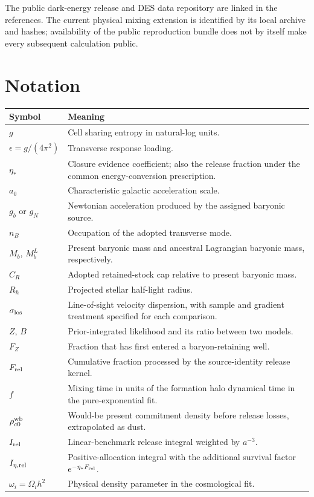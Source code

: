 The public dark-energy release and DES data repository are linked in the
references. The current physical mixing extension is identified by its
local archive and hashes; availability of the public reproduction bundle
does not by itself make every subsequent calculation public.

\section{Notation}
\small
\begin{tabularx}{\textwidth}{P{.23\textwidth}Y}
\toprule Symbol & Meaning \\
\midrule
$g$ & Cell sharing entropy in natural-log units. \\
$\epsilon=g/(4\pi^2)$ & Transverse response loading. \\
$\eta_*$ & Closure evidence coefficient; also the release fraction under
the common energy-conversion prescription. \\
$a_0$ & Characteristic galactic acceleration scale. \\
$g_b$ or $g_N$ & Newtonian acceleration produced by the assigned baryonic
source. \\
$n_B$ & Occupation of the adopted transverse mode. \\
$M_b$, $M_b^L$ & Present baryonic mass and ancestral Lagrangian baryonic
mass, respectively. \\
$C_R$ & Adopted retained-stock cap relative to present baryonic mass. \\
$R_h$ & Projected stellar half-light radius. \\
$\sigma_{\rm los}$ & Line-of-sight velocity dispersion, with sample and
gradient treatment specified for each comparison. \\
$Z$, $B$ & Prior-integrated likelihood and its ratio between two models. \\
$F_Z$ & Fraction that has first entered a baryon-retaining well. \\
$F_{\rm rel}$ & Cumulative fraction processed by the source-identity
release kernel. \\
$f$ & Mixing time in units of the formation halo dynamical time in the
pure-exponential fit. \\
$\rho_{c0}^{\rm wb}$ & Would-be present commitment density before release
losses, extrapolated as dust. \\
$I_{\rm rel}$ & Linear-benchmark release integral weighted by $a^{-3}$. \\
$I_{\eta,\rm rel}$ & Positive-allocation integral with the additional
survival factor $e^{-\eta_*F_{\rm rel}}$. \\
$\omega_i=\Omega_i h^2$ & Physical density parameter in the cosmological
fit. \\
\bottomrule
\end{tabularx}
\normalsize
